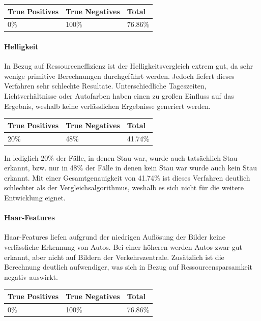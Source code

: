 \begin{center}
\scriptsize
    \begin{tabular}{ | l | l | l |}
    \hline
		True Positives & True Negatives & Total \\ \hline
    0\% &
		100\% &
		76.86\% \\
    \hline
    \end{tabular}
\end{center}

\paragraph{Helligkeit}
In Bezug auf Ressourceneffizienz ist der Helligkeitsvergleich extrem gut, da sehr wenige primitive Berechnungen durchgeführt werden.
Jedoch liefert dieses Verfahren sehr schlechte Resultate. Unterschiedliche Tageszeiten, Lichtverhältnisse oder Autofarben haben einen zu großen Einfluss auf das Ergebnis, weshalb keine verlässlichen Ergebnisse generiert werden.

\begin{center}
\scriptsize
    \begin{tabular}{ | l | l | l |}
    \hline
		True Positives & True Negatives & Total \\ \hline
    20\% &
		48\% &
		41.74\% \\
    \hline
    \end{tabular}
\end{center}

In lediglich 20\% der Fälle, in denen Stau war, wurde auch tatsächlich Stau erkannt, bzw. nur in 48\% der Fälle in denen kein Stau war wurde auch kein Stau erkannt.
Mit einer Gesamtgenauigkeit von 41.74\% ist dieses Verfahren deutlich schlechter als der Vergleichsalgorithmus, weshalb es sich nicht für die weitere Entwicklung eignet.

\paragraph{Haar-Features}
Haar-Features liefen aufgrund der niedrigen Auflösung der Bilder keine verlässliche Erkennung von Autos. Bei einer höheren werden Autos zwar gut erkannt, aber nicht auf Bildern der Verkehrszentrale. Zusätzlich ist die Berechnung deutlich aufwendiger, was sich in Bezug auf Ressourcensparsamkeit negativ auswirkt.

\begin{center}
\scriptsize
    \begin{tabular}{ | l | l | l |}
    \hline
		True Positives & True Negatives & Total \\ \hline
    0\% &
		100\% &
		76.86\% \\
    \hline
    \end{tabular}
\end{center}

